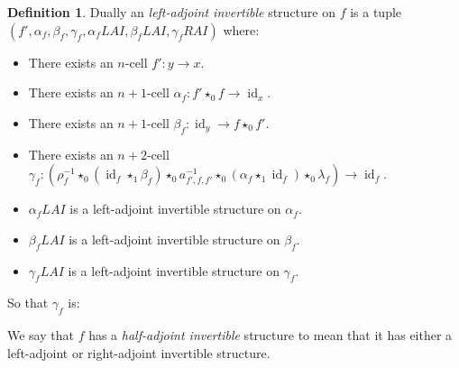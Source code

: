 \documentclass{article}
\theoremstyle{definition}
\newtheorem{definition}{Definition}
\theoremstyle{remark}
\DeclareMathOperator{\id}{id}
\newcommand{\inv}[1]{#1^{-1}}
\newcommand{\comp}{\star}
\begin{document}
\begin{definition}
  Dually an \emph{left-adjoint invertible} structure on \(f\) is a tuple \((f', \alpha_f, \beta_f, \gamma_f, \alpha_f{}LAI, \beta_f{}LAI, \gamma_f{}RAI)\) where:
  \begin{itemize}
  \item There exists an \(n\)-cell \(f' : y \to x\).
  \item There exists an \(n+1\)-cell \(\alpha_f: f' \comp_0 f \to \id_x\).
  \item There exists an \(n+1\)-cell \(\beta_f: \id_y \to f \comp_0 f'\).
  \item There exists an \(n+2\)-cell \(\gamma_f: (\rho_{f}^{-1} \comp_0 (\id_{f} \comp_1 \beta_f) \comp_0 \inv {a_{f',f,f'}} \comp_0 (\alpha_f \comp_1 \id_f) \comp_0 \lambda_f) \to \id_f\).
  \item \(\alpha_f{}LAI\) is a left-adjoint invertible structure on \(\alpha_f\).
  \item \(\beta_f{}LAI\) is a left-adjoint invertible structure on \(\beta_f\).
  \item \(\gamma_f{}LAI\) is a left-adjoint invertible structure on \(\gamma_f\).
  \end{itemize}

  So that \(\gamma_f\) is:
  \begin{center}
  \end{center}

  We say that \(f\) has a \emph{half-adjoint invertible} structure to mean that it has either a left-adjoint or right-adjoint invertible structure.
\end{definition}
\end{document}
